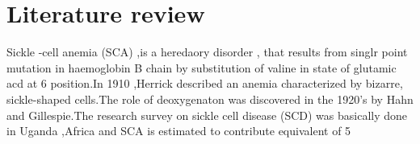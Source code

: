 \documentclass[12pt,]{article}
\begin{document}
\section{Literature review}
Sickle -cell anemia (SCA) ,is a heredaory disorder , that results from singlr point mutation in haemoglobin B chain by substitution of valine in state of glutamic acd at 6 position.In 1910 ,Herrick described an anemia characterized by bizarre, sickle-shaped cells.The role of deoxygenaton was discovered in the 1920’s by Hahn and Gillespie.The research survey on sickle cell disease (SCD) was basically done in Uganda ,Africa and SCA is estimated to contribute equivalent of 5%
\end{document}
